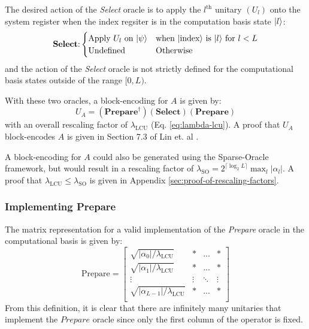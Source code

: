 The desired action of the \textit{Select} oracle is to apply the $l^\text{th}$ unitary $(U_l)$ onto the system register when the index regsiter is in the computation basis state $\ket{l}$:
\begin{equation}
    \label{eq:select}
    \textbf{Select}\text{:} 
    \begin{cases} 
        \text{Apply $U_l$ on $\ket{\psi}$} & \text{when $\ket{\text{index}}$ is $\ket{l}$ for $l < L$} \\
        \text{Undefined} & \text{Otherwise} \\
    \end{cases}
\end{equation}
and the action of the \textit{Select} oracle is not strictly defined for the computational basis states outside of the range $[0, L)$.

With these two oracles, a block-encoding for $A$ is given by:
\begin{equation}
    \label{eq:lcu-be}
    U_A = (\textbf{Prepare}^\dagger) (\textbf{Select}) (\textbf{Prepare})
\end{equation}
with an overall rescaling factor of $\lambda_\text{LCU}$ (Eq. \ref{eq:lambda-lcu}).
A proof that $U_A$ block-encodes $A$ is given in Section 7.3 of Lin et. al \cite{lin2022lecture}.

A block-encoding for $A$ could also be generated using the Sparse-Oracle framework, but would result in a rescaling factor of $\lambda_\text{SO} = 2^{\lceil \log_2L \rceil} \max_l |\alpha_l|$.
A proof that $\lambda_\text{LCU} \leq \lambda_\text{SO}$ is given in Appendix \ref{sec:proof-of-rescaling-factors}.

\subsubsection{Implementing \textbf{Prepare}}

The matrix representation for a valid implementation of the \textit{Prepare} oracle in the computational basis is given by:
\begin{equation}
    \text{Prepare} = \begin{bmatrix}
        \sqrt{|\alpha_0| / \lambda_\text{LCU}} & * & ... & * \\
        \sqrt{|\alpha_1| / \lambda_\text{LCU}} & * & ... & * \\
        \vdots & \vdots & \ddots & \vdots \\
        \sqrt{|\alpha_{L-1} |/ \lambda_\text{LCU}} & * & ... & * \\
    \end{bmatrix}
\end{equation}
From this definition, it is clear that there are infinitely many unitaries that implement the $\textit{Prepare}$ oracle since only the first column of the operator is fixed.

